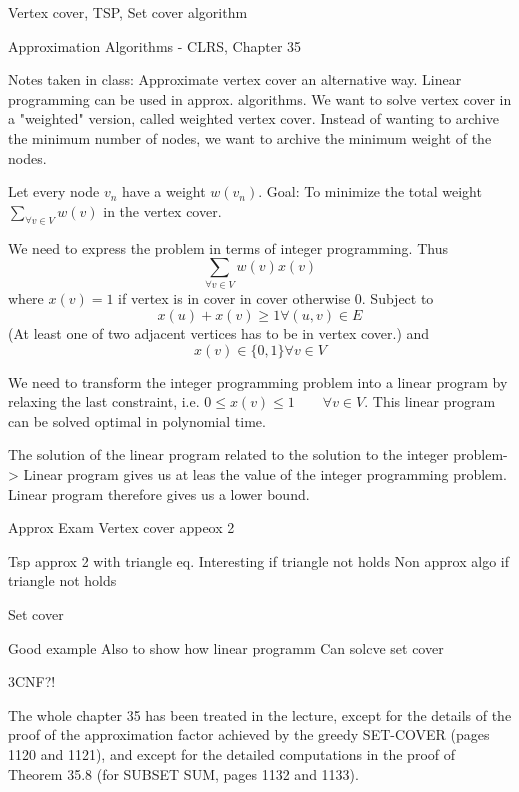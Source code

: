 \documentclass[10pt]{article}
\begin{document}
Vertex cover, TSP, Set cover algorithm

Approximation Algorithms - CLRS, Chapter 35

Notes taken in class:
Approximate vertex cover an alternative way. Linear programming can be used in approx. algorithms. We want to solve vertex cover in a "weighted" version, called weighted vertex cover. Instead of wanting to archive the minimum number of nodes, we want to archive the minimum weight of the nodes.

Let every node $v_n$ have a weight $w(v_n)$. Goal: To minimize the total weight $\sum_{\forall v \in V} w(v)$ in the vertex cover. 


We need to express the problem in terms of integer programming. Thus
\begin{equation}
\sum_{\forall v \in V} w(v) x(v)  
\end{equation}
where $x(v)=1$ if vertex is in cover in cover otherwise 0. Subject to
\begin{equation}
  x(u)+x(v) \geq 1 \forall (u,v) \in E
\end{equation}
(At least one of two adjacent vertices has to be in vertex cover.) and
\begin{equation}
    x(v)  \in \{0,1\} \forall v \in V 
\end{equation}

We need to transform the integer programming problem into a linear program by relaxing the last constraint, i.e. $0 \leq x(v) \leq 1 \qquad \forall v \in V$. This linear program can be solved optimal in polynomial time. 

The solution of the linear program related to the solution to the integer problem-> Linear program gives us at leas the value of the integer programming problem. Linear program therefore gives us a lower bound.

Approx Exam
Vertex cover appeox 2

Tsp approx 2 with triangle eq. Interesting if triangle not holds
Non approx algo if triangle not holds

Set cover

Good example Also to show how linear programm Can solcve set cover

3CNF?!               

The whole chapter 35 has been treated in the lecture, except for the details of the proof of the approximation factor achieved by the greedy SET-COVER (pages 1120 and 1121), and except for the detailed computations in the proof of Theorem 35.8 (for  SUBSET SUM, pages 1132 and 1133).
\end{document}
